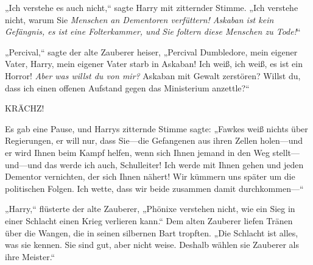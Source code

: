 „Ich verstehe es auch nicht,“ sagte Harry mit zitternder Stimme. „Ich verstehe nicht, warum Sie \emph{Menschen an Dementoren verfüttern! Askaban ist kein Gefängnis, es ist eine Folterkammer, und} \emph{Sie foltern diese Menschen zu Tode!}“

„Percival,“ sagte der alte Zauberer heiser, „Percival Dumbledore, mein eigener Vater, Harry, mein eigener Vater starb in Askaban! Ich weiß, ich weiß, es ist ein Horror! \emph{Aber was willst du von mir?} Askaban mit Gewalt zerstören? Willst du, dass ich einen offenen Aufstand gegen das Ministerium anzettle?“

KRÄCHZ!

Es gab eine Pause, und Harrys zitternde Stimme sagte: „Fawkes weiß nichts über Regierungen, er will nur, dass Sie—die Gefangenen aus ihren Zellen holen—und er wird Ihnen beim Kampf helfen, wenn sich Ihnen jemand in den Weg stellt—und—und das werde ich auch, Schulleiter! Ich werde mit Ihnen gehen und jeden Dementor vernichten, der sich Ihnen nähert! Wir kümmern uns später um die politischen Folgen. Ich wette, dass wir beide zusammen damit durchkommen—“

„Harry,“ flüsterte der alte Zauberer, „Phönixe verstehen nicht, wie ein Sieg in einer Schlacht einen Krieg verlieren kann.“ Dem alten Zauberer liefen Tränen über die Wangen, die in seinen silbernen Bart tropften. „Die Schlacht ist alles, was sie kennen. Sie sind gut, aber nicht weise. Deshalb wählen sie Zauberer als ihre Meister.“

